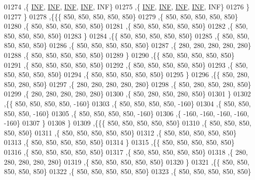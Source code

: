 \begin{DoxyCode}
01274    ,\{   \hyperlink{energy__const_8h_a12c2040f25d8e3a7b9e1c2024c618cb6}{INF},   \hyperlink{energy__const_8h_a12c2040f25d8e3a7b9e1c2024c618cb6}{INF},   \hyperlink{energy__const_8h_a12c2040f25d8e3a7b9e1c2024c618cb6}{INF},   \hyperlink{energy__const_8h_a12c2040f25d8e3a7b9e1c2024c618cb6}{INF},   INF\}
01275    ,\{   \hyperlink{energy__const_8h_a12c2040f25d8e3a7b9e1c2024c618cb6}{INF},   \hyperlink{energy__const_8h_a12c2040f25d8e3a7b9e1c2024c618cb6}{INF},   \hyperlink{energy__const_8h_a12c2040f25d8e3a7b9e1c2024c618cb6}{INF},   \hyperlink{energy__const_8h_a12c2040f25d8e3a7b9e1c2024c618cb6}{INF},   INF\}
01276    \}
01277   \}
01278  ,\{\{\{   850,   850,   850,   850,   850\}
01279    ,\{   850,   850,   850,   850,   850\}
01280    ,\{   850,   850,   850,   850,   850\}
01281    ,\{   850,   850,   850,   850,   850\}
01282    ,\{   850,   850,   850,   850,   850\}
01283    \}
01284   ,\{\{   850,   850,   850,   850,   850\}
01285    ,\{   850,   850,   850,   850,   850\}
01286    ,\{   850,   850,   850,   850,   850\}
01287    ,\{   280,   280,   280,   280,   280\}
01288    ,\{   850,   850,   850,   850,   850\}
01289    \}
01290   ,\{\{   850,   850,   850,   850,   850\}
01291    ,\{   850,   850,   850,   850,   850\}
01292    ,\{   850,   850,   850,   850,   850\}
01293    ,\{   850,   850,   850,   850,   850\}
01294    ,\{   850,   850,   850,   850,   850\}
01295    \}
01296   ,\{\{   850,   280,   850,   280,   850\}
01297    ,\{   280,   280,   280,   280,   280\}
01298    ,\{   850,   280,   850,   280,   850\}
01299    ,\{   280,   280,   280,   280,   280\}
01300    ,\{   850,   280,   850,   280,   850\}
01301    \}
01302   ,\{\{   850,   850,   850,   850,  -160\}
01303    ,\{   850,   850,   850,   850,  -160\}
01304    ,\{   850,   850,   850,   850,  -160\}
01305    ,\{   850,   850,   850,   850,  -160\}
01306    ,\{  -160,  -160,  -160,  -160,  -160\}
01307    \}
01308   \}
01309  ,\{\{\{   850,   850,   850,   850,   850\}
01310    ,\{   850,   850,   850,   850,   850\}
01311    ,\{   850,   850,   850,   850,   850\}
01312    ,\{   850,   850,   850,   850,   850\}
01313    ,\{   850,   850,   850,   850,   850\}
01314    \}
01315   ,\{\{   850,   850,   850,   850,   850\}
01316    ,\{   850,   850,   850,   850,   850\}
01317    ,\{   850,   850,   850,   850,   850\}
01318    ,\{   280,   280,   280,   280,   280\}
01319    ,\{   850,   850,   850,   850,   850\}
01320    \}
01321   ,\{\{   850,   850,   850,   850,   850\}
01322    ,\{   850,   850,   850,   850,   850\}
01323    ,\{   850,   850,   850,   850,   850\}

\end{DoxyCode}
